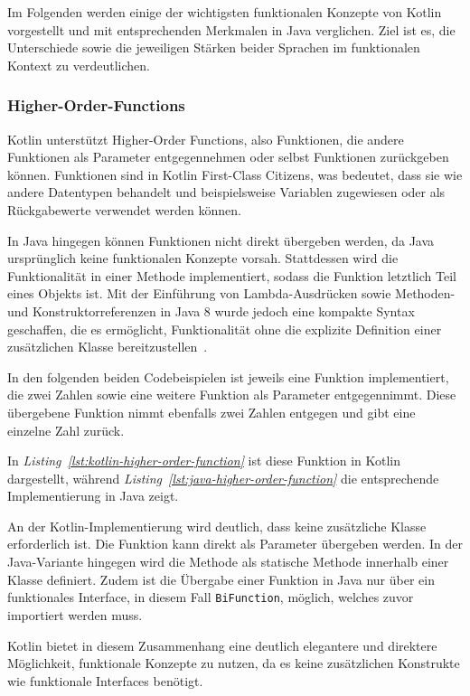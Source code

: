 \documentclass[11pt]{article}
\begin{document}
    Im Folgenden werden einige der wichtigsten funktionalen Konzepte von Kotlin vorgestellt und mit entsprechenden Merkmalen in Java verglichen.
    Ziel ist es, die Unterschiede sowie die jeweiligen Stärken beider Sprachen im funktionalen Kontext zu verdeutlichen.

    \subsubsection{Higher-Order-Functions}
    Kotlin unterstützt Higher-Order Functions, also Funktionen, die andere Funktionen als Parameter entgegennehmen oder selbst Funktionen zurückgeben können.
    Funktionen sind in Kotlin First-Class Citizens, was bedeutet, dass sie wie andere Datentypen behandelt und beispielsweise Variablen zugewiesen oder als Rückgabewerte verwendet werden können.

    In Java hingegen können Funktionen nicht direkt übergeben werden, da Java ursprünglich keine funktionalen Konzepte vorsah.
    Stattdessen wird die Funktionalität in einer Methode implementiert, sodass die Funktion letztlich Teil eines Objekts ist.
    Mit der Einführung von Lambda-Ausdrücken sowie Methoden- und Konstruktorreferenzen in Java 8 wurde jedoch eine kompakte Syntax geschaffen, die es ermöglicht, Funktionalität ohne die explizite Definition einer zusätzlichen Klasse bereitzustellen~\cite[820]{insel}.

    In den folgenden beiden Codebeispielen ist jeweils eine Funktion implementiert, die zwei Zahlen sowie eine weitere Funktion als Parameter entgegennimmt.
    Diese übergebene Funktion nimmt ebenfalls zwei Zahlen entgegen und gibt eine einzelne Zahl zurück.

    In \textit{Listing~\ref{lst:kotlin-higher-order-function}} ist diese Funktion in Kotlin dargestellt, während \textit{Listing~\ref{lst:java-higher-order-function}} die entsprechende Implementierung in Java zeigt.

    An der Kotlin-Implementierung wird deutlich, dass keine zusätzliche Klasse erforderlich ist.
    Die Funktion kann direkt als Parameter übergeben werden.
    In der Java-Variante hingegen wird die Methode als statische Methode innerhalb einer Klasse definiert.
    Zudem ist die Übergabe einer Funktion in Java nur über ein funktionales Interface, in diesem Fall \texttt{BiFunction}, möglich, welches zuvor importiert werden muss.

    Kotlin bietet in diesem Zusammenhang eine deutlich elegantere und direktere Möglichkeit, funktionale Konzepte zu nutzen, da es keine zusätzlichen Konstrukte wie funktionale Interfaces benötigt.
\end{document}

